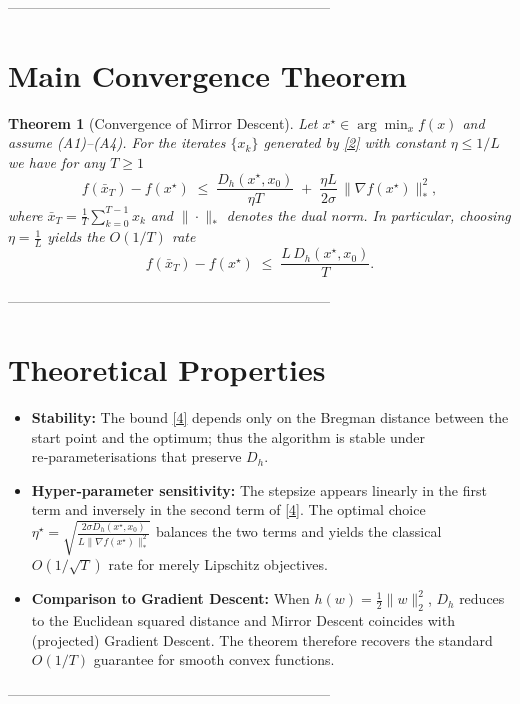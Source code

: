\documentclass{article}
\newtheorem{theorem}{Theorem}
\begin{document}
---------------------------------------------------------------------

\section*{Main Convergence Theorem}
\begin{theorem}[Convergence of Mirror Descent]
\label{thm:md}
Let $x^{\star}\in\arg\min_{x}f(x)$ and assume (A1)–(A4).  
For the iterates $\{x_{k}\}$ generated by \eqref{2} with constant
$\eta\le 1/L$ we have for any $T\ge 1$
\[
f(\bar{x}_{T})-f(x^{\star})
\;\le\;
\frac{D_{h}(x^{\star},x_{0})}{\eta T}
\;+\;
\frac{\eta L}{2\sigma}\, \big\|\nabla f(x^{\star})\big\|_{*}^{2},
\tag{4}
\]
where $\bar{x}_{T}= \frac1T\sum_{k=0}^{T-1}x_{k}$ and $\|\cdot\|_{*}$ denotes the dual norm.
In particular, choosing $\eta = \frac{1}{L}$ yields the $O(1/T)$ rate
\[
f(\bar{x}_{T})-f(x^{\star})\;\le\;
\frac{L\,D_{h}(x^{\star},x_{0})}{T}.
\tag{5}
\]
\end{theorem}

---------------------------------------------------------------------

\section*{Theoretical Properties}
\begin{itemize}
\item \textbf{Stability:} The bound \eqref{4} depends only on the
Bregman distance between the start point and the optimum; thus the
algorithm is stable under re‑parameterisations that preserve $D_{h}$.
\item \textbf{Hyper‑parameter sensitivity:}
The stepsize appears linearly in the first term and inversely in the
second term of \eqref{4}. The optimal choice $\eta^{\star}
= \sqrt{\frac{2\sigma D_{h}(x^{\star},x_{0})}{L\|\nabla f(x^{\star})\|_{*}^{2}}}$ balances the two terms and yields the classical $O(1/\sqrt{T})$ rate for merely Lipschitz objectives.
\item \textbf{Comparison to Gradient Descent:}
When $h(w)=\tfrac12\|w\|_{2}^{2}$, $D_{h}$ reduces to the Euclidean
squared distance and Mirror Descent coincides with (projected) Gradient
Descent. The theorem therefore recovers the standard $O(1/T)$ guarantee for smooth convex functions.
\end{itemize}

---------------------------------------------------------------------
\end{document}
